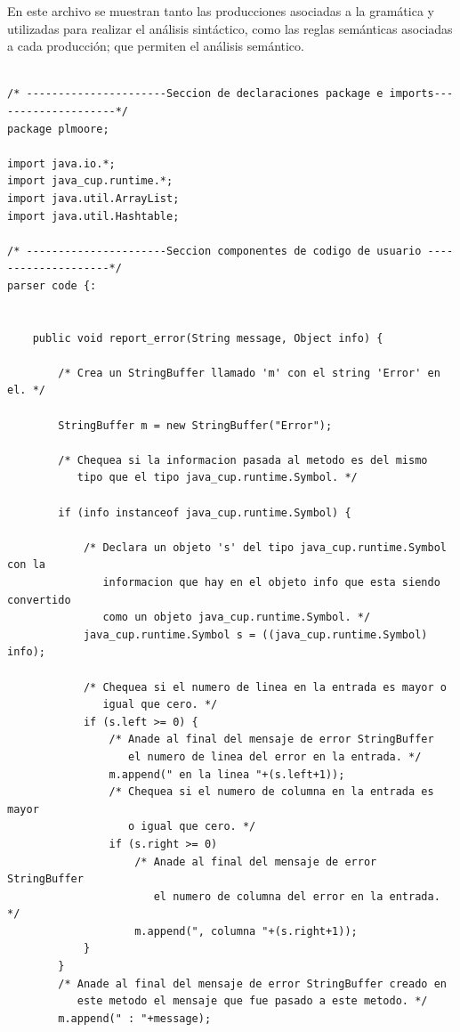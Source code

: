 \documentclass[12pt,a4paper]{article}
\begin{document}
En este archivo se muestran tanto las producciones asociadas a la gramática y utilizadas para realizar el análisis sintáctico, como las reglas semánticas asociadas a cada producción; que permiten el análisis semántico. 

\begin{lstlisting}[caption=Analizador Sintáctico y Semántico en CUP]

/* ----------------------Seccion de declaraciones package e imports--------------------*/
package plmoore;

import java.io.*;
import java_cup.runtime.*;
import java.util.ArrayList;
import java.util.Hashtable;

/* ----------------------Seccion componentes de codigo de usuario --------------------*/
parser code {:


	public void report_error(String message, Object info) {
   
        /* Crea un StringBuffer llamado 'm' con el string 'Error' en el. */

        StringBuffer m = new StringBuffer("Error");
   
        /* Chequea si la informacion pasada al metodo es del mismo
           tipo que el tipo java_cup.runtime.Symbol. */

        if (info instanceof java_cup.runtime.Symbol) {

            /* Declara un objeto 's' del tipo java_cup.runtime.Symbol con la
               informacion que hay en el objeto info que esta siendo convertido
               como un objeto java_cup.runtime.Symbol. */
            java_cup.runtime.Symbol s = ((java_cup.runtime.Symbol) info);
   
            /* Chequea si el numero de linea en la entrada es mayor o
               igual que cero. */
            if (s.left >= 0) {                
                /* Anade al final del mensaje de error StringBuffer
                   el numero de linea del error en la entrada. */
                m.append(" en la linea "+(s.left+1));   
                /* Chequea si el numero de columna en la entrada es mayor
                   o igual que cero. */
                if (s.right >= 0)                    
                    /* Anade al final del mensaje de error StringBuffer
                       el numero de columna del error en la entrada. */
                    m.append(", columna "+(s.right+1));
            }
        }
        /* Anade al final del mensaje de error StringBuffer creado en
           este metodo el mensaje que fue pasado a este metodo. */
        m.append(" : "+message);
   

\end{lstlisting}
\end{document}
